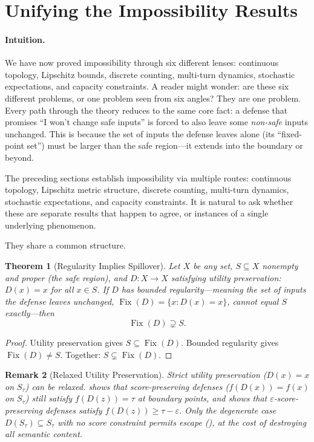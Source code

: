\documentclass[11pt]{article}
\newtheorem{theorem}{Theorem}[section]
\newtheorem{remark}[theorem]{Remark}
\newcommand{\Fix}{\operatorname{Fix}}
\begin{document}
\section{Unifying the Impossibility Results}
\label{sec:meta}

\paragraph{Intuition.}
We have now proved impossibility through six different lenses:
continuous topology, Lipschitz bounds, discrete counting, multi-turn
dynamics, stochastic expectations, and capacity constraints. A reader
might wonder: are these six different problems, or one problem seen
from six angles? They are one problem. Every path through the theory
reduces to the same core fact: a defense that promises ``I won't
change safe inputs'' is forced to also leave some \emph{non-safe}
inputs unchanged. This is because the set of inputs the defense
leaves alone (its ``fixed-point set'') must be larger than the safe
region---it extends into the boundary or beyond.

The preceding sections establish impossibility via multiple routes:
continuous topology, Lipschitz metric structure, discrete counting,
multi-turn dynamics, stochastic expectations, and capacity constraints.
It is natural to ask whether these are separate results that happen to
agree, or instances of a single underlying phenomenon.

They share a common structure.

\begin{theorem}[Regularity Implies Spillover]
\label{thm:meta}
Let $X$ be any set, $S \subseteq X$ nonempty and proper (the safe
region), and $D\colon X \to X$ satisfying utility preservation:
$D(x) = x$ for all $x \in S$. If $D$ has \emph{bounded
regularity}---meaning the set of inputs the defense leaves unchanged,
$\Fix(D) = \{x : D(x) = x\}$, cannot equal $S$ exactly---then
\[
  \Fix(D) \supsetneq S.
\]
\end{theorem}

\begin{proof}
Utility preservation gives $S \subseteq \Fix(D)$. Bounded regularity
gives $\Fix(D) \neq S$. Together: $S \subsetneq \Fix(D)$.
\end{proof}

\begin{remark}[Relaxed Utility Preservation]
Strict utility preservation ($D(x) = x$ on $S_\tau$) can be relaxed.
 shows that score-preserving defenses
($f(D(x)) = f(x)$ on $S_\tau$) still satisfy $f(D(z)) = \tau$ at
boundary points, and  shows that
$\varepsilon$-score-preserving defenses satisfy
$f(D(z)) \geq \tau - \varepsilon$. Only the degenerate case
$D(S_\tau) \subseteq S_\tau$ with no score constraint permits escape
(), at the cost of destroying all
semantic content.
\end{remark}
\end{document}
